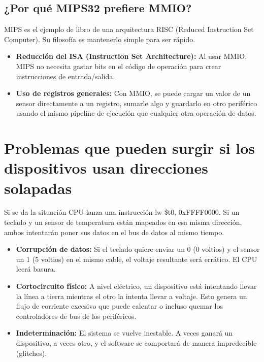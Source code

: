 \documentclass[]{article}
\begin{document}
	\subsection{¿Por qué MIPS32 prefiere MMIO?}
		MIPS es el ejemplo de libro de una arquitectura RISC (Reduced Instruction Set Computer). Su filosofía es mantenerlo simple para ser rápido.
		\begin{itemize}
			\item \textbf{Reducción del ISA (Instruction Set Architecture):} Al usar MMIO, MIPS no necesita gastar bits en el código de operación para crear instrucciones de entrada/salida.
			\item \textbf{Uso de registros generales:} Con MMIO, se puede cargar un valor de un sensor directamente a un registro, sumarle algo y guardarlo en otro periférico usando el mismo pipeline de ejecución que cualquier otra operación de datos.
		\end{itemize}
		
\section{Problemas que pueden surgir si los 
	dispositivos usan direcciones solapadas}
	
	Si se da la situación CPU lanza una instrucción lw \$t0, 0xFFFF0000. Si un teclado y un sensor de temperatura están mapeados en esa misma dirección, ambos intentarán poner sus datos en el bus de datos al mismo tiempo.
	\begin{itemize}
		\item \textbf{Corrupción de datos:} Si el teclado quiere enviar un 0 (0 voltios) y el sensor un 1 (5 voltios) en el mismo cable, el
		voltaje resultante será errático. El CPU leerá basura.
		\item \textbf{Cortocircuito físico:} A nivel eléctrico, un dispositivo está intentando llevar la línea a tierra mientras el otro la intenta llevar a voltaje. Esto genera un flujo de corriente excesivo que puede calentar o incluso quemar los controladores de bus de los periféricos.
		\item \textbf{Indeterminación:} El sistema se vuelve inestable. A veces ganará un dispositivo, a veces otro, y el software se comportará de manera impredecible (glitches).
	\end{itemize}
	
\end{document}
